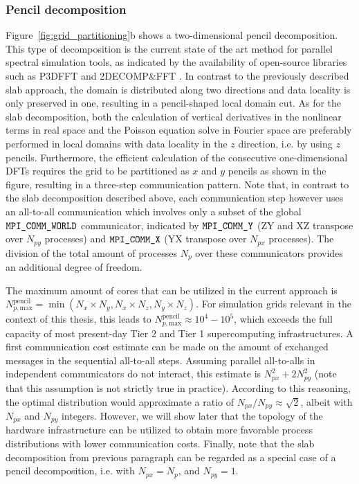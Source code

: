 \subsubsection{Pencil decomposition} 
Figure~\ref{fig:grid_partitioning}b shows a two-dimensional pencil decomposition. This type of decomposition is the current state of the art method for parallel spectral simulation tools, as indicated by the availability of open-source libraries such as P3DFFT \citep{pekurovsky2012p3dfft} and 2DECOMP\&FFT \citep{li20102decomp}. In contrast to the previously described slab approach, the domain is distributed along two directions and data locality is only preserved in one, resulting in a pencil-shaped local domain cut. As for the slab decomposition, both the calculation of vertical derivatives in the nonlinear terms in real space and the Poisson equation solve in Fourier space are preferably performed in local domains with data locality in the $z$ direction, i.e. by using $z$ pencils. Furthermore, the efficient calculation of the consecutive one-dimensional DFTs requires the grid to be partitioned as $x$ and $y$ pencils as shown in the figure, resulting in a three-step communication pattern. Note that, in contrast to the slab decomposition described above, each communication step however uses an all-to-all communication which involves only a subset of the global $\verb|MPI_COMM_WORLD|$ communicator, indicated by $\verb|MPI_COMM_Y|$ (ZY and XZ transpose over $N_{py}$ processes) and $\verb|MPI_COMM_X|$ (YX transpose over $N_{px}$ processes). The division of the total amount of processes $N_p$ over these communicators provides an additional degree of freedom. 

The maximum amount of cores that can be utilized in the current approach is $N_{p,\text{max}}^{\text{pencil}} = \min(N_x \times N_y, N_x \times N_z, N_y \times N_z)$. For simulation grids relevant in the context of this thesis, this leads to $N_{p,\text{max}}^{\text{pencil}} \approx 10^4 - 10^5$, which exceeds the full capacity of most present-day Tier 2 and Tier 1 supercomputing infrastructures. A first communication cost estimate can be made on the amount of exchanged messages in the sequential all-to-all steps. Assuming parallel all-to-alls in independent communicators do not interact, this estimate is $N_{px}^2 + 2N_{py}^2$ (note that this assumption is not strictly true in practice). According to this reasoning, the optimal distribution would approximate a ratio of $N_{px}/N_{py} \approx \sqrt{2}$, albeit with $N_{px}$ and $N_{py}$ integers. However, we will show later that the topology of the hardware infrastructure can be utilized to obtain more favorable process distributions with lower communication costs. Finally, note that the slab decomposition from previous paragraph can be regarded as a special case of a pencil decomposition, i.e. with $N_{px} = N_p$, and $N_{py} = 1$. 

